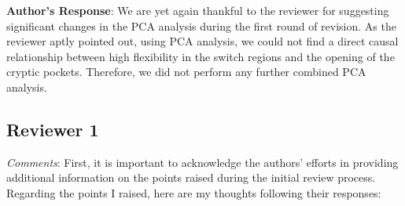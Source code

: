 \documentclass[11pt, a4paper]{article}
\begin{document}
\begin{enumerate}
 
    \textbf{Author's Response}: We are yet again thankful to the reviewer for suggesting significant changes in the PCA analysis during the first round of revision. As the reviewer aptly pointed out, using PCA analysis, we could not find a direct causal relationship between high flexibility in the switch regions and the opening of the cryptic pockets. Therefore, we did not perform any further combined PCA analysis. 

\end{enumerate}

\subsection{Reviewer 1}
\emph{Comments}:
First, it is important to acknowledge the authors' efforts in providing additional information on the points raised during the initial review process.
Regarding the points I raised, here are my thoughts following their responses:
\end{document}
